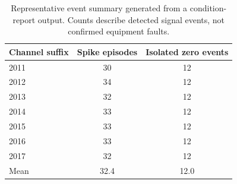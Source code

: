 \begin{table}[t]
  \centering
  \caption{Representative event summary generated from a condition-report output. Counts describe detected signal events, not confirmed equipment faults.}
  \label{tab:a2-events}
  \small
  \begin{tabular}{lcc}
    \toprule
    Channel suffix & Spike episodes & Isolated zero events \\
    \midrule
    2011 & 30 & 12 \\
    2012 & 34 & 12 \\
    2013 & 32 & 12 \\
    2014 & 33 & 12 \\
    2015 & 33 & 12 \\
    2016 & 33 & 12 \\
    2017 & 32 & 12 \\
    \midrule
    Mean & 32.4 & 12.0 \\
    \bottomrule
  \end{tabular}
\end{table}
